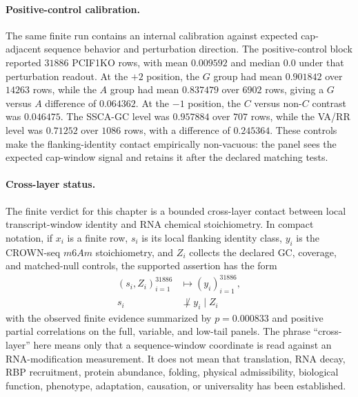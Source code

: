 \paragraph{Positive-control calibration.}
The same finite run contains an internal calibration against expected cap-adjacent sequence behavior and perturbation direction.  The positive-control block reported $31886$ PCIF1KO rows, with mean $0.009592$ and median $0.0$ under that perturbation readout.  At the $+2$ position, the $G$ group had mean $0.901842$ over $14263$ rows, while the $A$ group had mean $0.837479$ over $6902$ rows, giving a $G$ versus $A$ difference of $0.064362$.  At the $-1$ position, the $C$ versus non-$C$ contrast was $0.046475$.  The SSCA-GC level was $0.957884$ over $707$ rows, while the VA/RR level was $0.71252$ over $1086$ rows, with a difference of $0.245364$.  These controls make the flanking-identity contact empirically non-vacuous: the panel sees the expected cap-window signal and retains it after the declared matching tests.

\paragraph{Cross-layer status.}
The finite verdict for this chapter is a bounded cross-layer contact between local transcript-window identity and RNA chemical stoichiometry.  In compact notation, if $x_i$ is a finite row, $s_i$ is its local flanking identity class, $y_i$ is the CROWN-seq $m6Am$ stoichiometry, and $Z_i$ collects the declared GC, coverage, and matched-null controls, the supported assertion has the form
$$
\begin{aligned}
  (s_i, Z_i)_{i=1}^{31886} &\longmapsto (y_i)_{i=1}^{31886},\\
  s_i &\not\perp y_i \mid Z_i
\end{aligned}
$$
with the observed finite evidence summarized by $p=0.000833$ and positive partial correlations on the full, variable, and low-tail panels.  The phrase ``cross-layer'' here means only that a sequence-window coordinate is read against an RNA-modification measurement.  It does not mean that translation, RNA decay, RBP recruitment, protein abundance, folding, physical admissibility, biological function, phenotype, adaptation, causation, or universality has been established.

